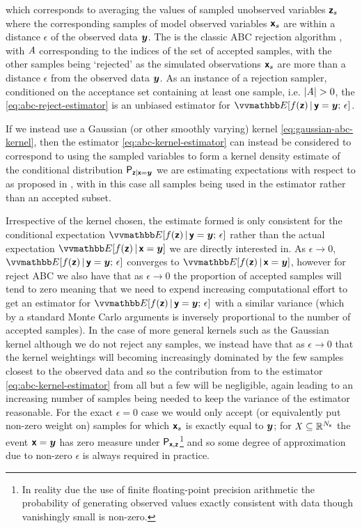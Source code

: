 which corresponds to averaging the values of sampled unobserved variables $\boldsymbol{\mathsf{z}}_s$ where the corresponding samples of model observed variables $\boldsymbol{\mathsf{x}}_s$ are within a distance $\epsilon$ of the observed data $\boldsymbol{y}$. The is the classic \ac{ABC} rejection algorithm \citep{rubin1984bayesianly,tavare1997inferring,fu1997estimating,weiss1998inference,pritchard1999population} , with $\mathit{A}$ corresponding to the indices of the set of accepted samples, with the other samples being `rejected' as the simulated observations $\boldsymbol{\mathsf{x}}_s$ are more than a distance $\epsilon$ from the observed data $\boldsymbol{y}$. As an instance of a rejection sampler, conditioned on the acceptance set containing at least one sample, i.e. $|\mathit{A}| > 0$, the \eqref{eq:abc-reject-estimator} is an unbiased estimator for $\expc{f(\rvct{z}) \gvn \rvct{y} = \vct{y};\,\epsilon}$.

If we instead use a Gaussian (or other smoothly varying) kernel \eqref{eq:gaussian-abc-kernel}, then the estimator \eqref{eq:abc-kernel-estimator} can instead be considered to correspond to using the sampled variables to form a kernel density estimate of the conditional distribution $\mathsf{P}_{\boldsymbol{\mathsf{z}}|\boldsymbol{\mathsf{x}}=\boldsymbol{y}}$ we are estimating expectations with respect to as proposed in \citep{beaumont2002approximate}, with in this case all samples being used in the estimator rather than an accepted subset. 

Irrespective of the kernel chosen, the estimate formed is only consistent for the conditional expectation $\expc{f(\rvct{z}) \gvn \rvct{y} = \vct{y};\,\epsilon}$ rather than the actual expectation $\expc{f(\rvct{z}) \gvn \rvct{x} = \vct{y}}$ we are directly interested in. As $\epsilon \to 0$, $\expc{f(\rvct{z}) \gvn \rvct{y} = \vct{y};\,\epsilon}$ converges to $\expc{f(\rvct{z}) \gvn \rvct{x} = \vct{y}}$, however for reject \ac{ABC} we also have that as $\epsilon \to 0$ the proportion of accepted samples will tend to zero meaning that we need to expend increasing computational effort to get an estimator for $\expc{f(\rvct{z}) \gvn \rvct{y} = \vct{y};\,\epsilon}$ with a similar variance (which by a standard Monte Carlo arguments is inversely proportional to the number of accepted samples). In the case of more general kernels such as the Gaussian kernel although we do not reject any samples, we instead have that as $\epsilon \to 0$ that the kernel weightings will becoming increasingly dominated by the few samples closest to the observed data and so the contribution from to the estimator \eqref{eq:abc-kernel-estimator} from all but a few will be negligible, again leading to an increasing number of samples being needed to keep the variance of the estimator reasonable. For the exact $\epsilon = 0$ case we would only accept (or equivalently put non-zero weight on) samples for which $\boldsymbol{\mathsf{x}}_s$ is exactly equal to $\boldsymbol{y}$; for $\mathit{X} \subseteq \mathbb{R}^{N_{\boldsymbol{\mathsf{x}}}}$ the event $\boldsymbol{\mathsf{x}} = \boldsymbol{y}$ has zero measure under $\mathsf{P}_{\boldsymbol{\mathsf{x}},\boldsymbol{\mathsf{z}}}$\footnote{In reality due the use of finite floating-point precision arithmetic the probability of generating observed values exactly consistent with data though vanishingly small is non-zero.} and so some degree of approximation due to non-zero $\epsilon$ is always required in practice. 

